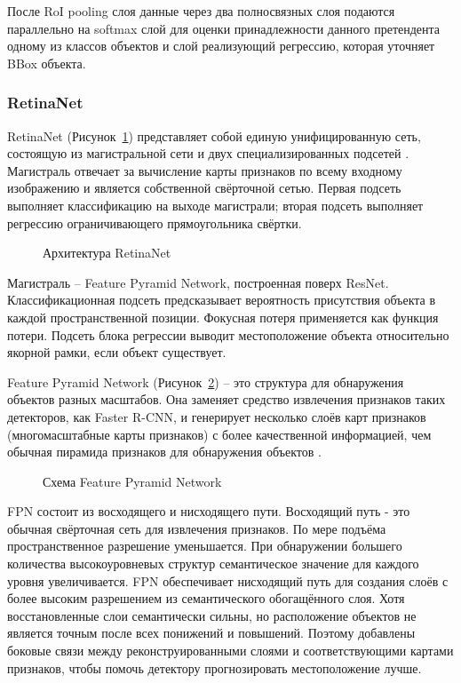 После RoI pooling слоя данные через два полносвязных слоя подаются параллельно на softmax слой для оценки принадлежности данного претендента одному из классов объектов и  слой реализующий регрессию, которая уточняет BBox объекта.

\subsubsection{RetinaNet}
RetinaNet (Рисунок~\ref{retina0}) представляет собой единую унифицированную сеть, состоящую из магистральной сети и двух специализированных подсетей \cite{retina2}. Магистраль отвечает за вычисление карты признаков по всему входному изображению и является собственной свёрточной сетью. Первая подсеть выполняет классификацию на выходе магистрали; вторая подсеть выполняет регрессию ограничивающего прямоугольника свёртки. 

\begin{figure}[H]
	\caption{Архитектура RetinaNet}
	\label{retina0}
\end{figure} 

Магистраль -- Feature Pyramid Network, построенная поверх ResNet. Классификационная подсеть предсказывает вероятность присутствия объекта в каждой пространственной позиции. Фокусная потеря применяется как функция потери. Подсеть блока регрессии выводит местоположение объекта относительно якорной рамки, если объект существует.

Feature Pyramid Network (Рисунок~\ref{retina1}) -- это структура для обнаружения объектов разных масштабов. Она заменяет средство извлечения признаков таких детекторов, как Faster R-CNN, и генерирует несколько слоёв карт признаков (многомасштабные карты признаков) с более качественной информацией, чем обычная пирамида признаков для обнаружения объектов \cite{fpn}.

\begin{figure}[H]
	\caption{Схема Feature Pyramid Network}
	\label{retina1}
\end{figure}

FPN состоит из восходящего и нисходящего пути. Восходящий путь - это обычная свёрточная сеть для извлечения признаков. По мере подъёма пространственное разрешение уменьшается. При обнаружении большего количества высокоуровневых структур семантическое значение для каждого уровня увеличивается. FPN обеспечивает нисходящий путь для создания слоёв с более высоким разрешением из семантического обогащённого слоя. Хотя восстановленные слои семантически сильны, но расположение объектов не является точным после всех понижений и повышений. Поэтому добавлены боковые связи между реконструированными слоями и соответствующими картами признаков, чтобы помочь детектору прогнозировать местоположение лучше.

